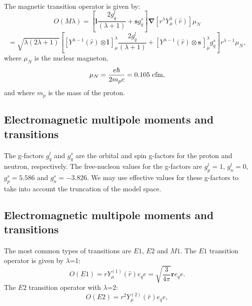 \documentclass[%
twoside,                 %
final,                   %
10pt]{article}
\begin{document}
\paragraph{}
The magnetic transition operator is given by:
\[
O(M\lambda)=\left[\mathbf{l}\frac{2g^{l }_{q}}{(\lambda +1)}+ \mathbf{s}g^{s}_{q}\right]\mathbf{\nabla}[r^{\lambda }Y^{\lambda }_{\mu }(\hat{r})]\mu _{N}
\]
\[
= \sqrt{\lambda (2\lambda +1)}\left[[Y^{\lambda -1}(\hat{r})\otimes \mathbf{l}\,]^{\lambda }_{\mu }\frac{2g^{l}_{q}}{(\lambda +1)}
+ [Y^{\lambda -1}(\hat{r})\otimes \mathbf{s}\,]^{\lambda }_{\mu }g^{s}_{q}\right]r^{\lambda -1}\mu _{N}, 
\]
 where $\mu_{N}$ is the nuclear magneton,
\[
\mu _{N}=\frac{e\hbar }{2m_{p}c} = 0.105 \; e {\rm fm}, 
\]
and where $m_{p}$ is the mass of the proton.



\subsection*{Electromagnetic multipole moments and transitions}

\paragraph{}
The g-factors $g^{l}_{q}$ and $g^{s}_{q}$
are the orbital and spin g-factors
for the proton and neutron, respectively.
The
free-nucleon values for the g-factors are $g^{l}_{p}=1$, $g^{l}_{n}=0$,
$g^{s}_{p}=5.586$ and $g^{s}_{n}=-3.826$. We may use effective values
for these g-factors to take into account the truncation of the model
space.



\subsection*{Electromagnetic multipole moments and transitions}

\paragraph{}
The most common types of transitions are $E1$, $E2$ and $M1$.
The $E1$ transition operator is given by $\lambda$=1:
\[
O(E1) = rY^{(1)}_{\mu }(\hat{r})e_{q} e= \sqrt{\frac{3}{4\pi }}\mathbf{r}e_{q} e.
\]
The $E2$ transition operator with $\lambda$=2:
\[
O(E2) = r^{2}Y^{(2)}_{\mu }(\hat{r})e_{q} e,  
\]
\end{document}
